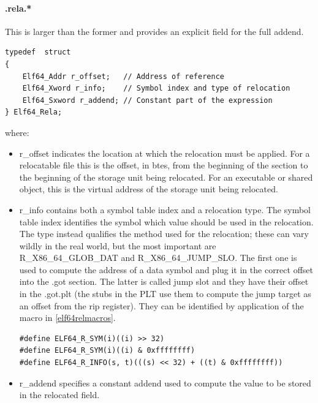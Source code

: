 \paragraph{.rela.*} This is larger than the former and provides an explicit field for the full addend.
\begin{lstlisting}[style=ansic, caption={.rel.* entries}, label=rel]
typedef  struct
{
    Elf64_Addr r_offset;   // Address of reference
    Elf64_Xword r_info;    // Symbol index and type of relocation
    Elf64_Sxword r_addend; // Constant part of the expression
} Elf64_Rela;
\end{lstlisting} where:
\begin{itemize}
    \item {\ttfamily r\_offset} indicates the location at which the relocation must be applied.  For a relocatable file this is the offset, in btes, from the beginning of the section to the beginning of the storage unit being relocated. For an executable or shared object, this is the virtual address of the storage unit being relocated.
    \item {\ttfamily r\_info} contains both a symbol table index and a relocation type. The symbol table index identifies the symbol which value should be used in the relocation.  The type instead qualifies the method used for the relocation; these can vary wildly in the real world, but the most important are {\ttfamily R\_X86\_64\_GLOB\_DAT} and {\ttfamily R\_X86\_64\_JUMP\_SLO}.
        \subitem The first one is used to compute the address of a data symbol and plug it in the correct offset into the {\ttfamily .got} section.
        \subitem The latter is called jump slot and they have their offset in the {\ttfamily .got.plt} (the stubs in the PLT use them to compute the jump target as an offset from the {\ttfamily rip} register).  They can be identified by application of the macro in \ref{elf64relmacros}.
        \begin{lstlisting}[style=ansic,caption={Macros},label=elf64relmacros]
#define ELF64_R_SYM(i)((i) >> 32)
#define ELF64_R_SYM(i)((i) & 0xffffffff)
#define ELF64_R_INFO(s, t)(((s) << 32) + ((t) & 0xffffffff))
       \end{lstlisting}
    \item {\ttfamily r\_addend} specifies a constant addend used to compute the value to be stored in the relocated field.  \end{itemize}
